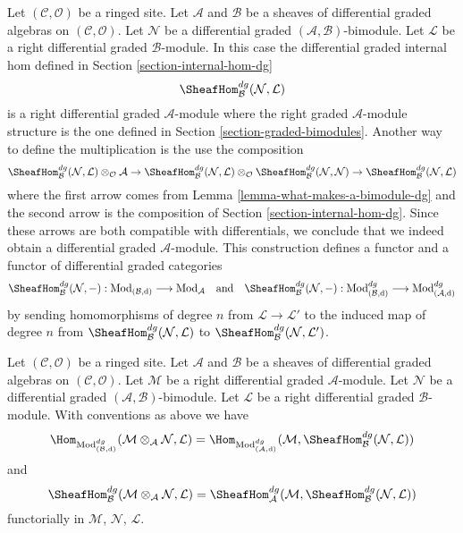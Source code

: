 \medskip\noindent
Let $(\mathcal{C}, \mathcal{O})$ be a ringed site. Let $\mathcal{A}$
and $\mathcal{B}$ be a sheaves of differential graded algebras on
$(\mathcal{C}, \mathcal{O})$. Let $\mathcal{N}$ be a
differential graded $(\mathcal{A}, \mathcal{B})$-bimodule. Let 
$\mathcal{L}$ be a right differential graded $\mathcal{B}$-module.
In this case the differential graded internal hom
defined in Section \ref{section-internal-hom-dg}
$$
\SheafHom_\mathcal{B}^{dg}(\mathcal{N}, \mathcal{L})
$$
is a right differential graded $\mathcal{A}$-module where the
right graded $\mathcal{A}$-module structure is the one defined
in Section \ref{section-graded-bimodules}. Another way to define
the multiplication is the use the composition
$$
\SheafHom_\mathcal{B}^{dg}(\mathcal{N}, \mathcal{L})
\otimes_\mathcal{O} \mathcal{A}
\to
\SheafHom_\mathcal{B}^{dg}(\mathcal{N}, \mathcal{L})
\otimes_\mathcal{O} \SheafHom_\mathcal{B}^{dg}(\mathcal{N}, \mathcal{N})
\to
\SheafHom_\mathcal{B}^{dg}(\mathcal{N}, \mathcal{L})
$$
where the first arrow comes from Lemma \ref{lemma-what-makes-a-bimodule-dg}
and the second arrow is the composition of
Section \ref{section-internal-hom-dg}. Since these arrows are
both compatible with differentials, we conclude that we indeed
obtain a differential graded $\mathcal{A}$-module.
This construction
defines a functor and a functor of differential graded categories
$$
\SheafHom_\mathcal{B}^{dg}(\mathcal{N}, -) :
\text{Mod}_{(\mathcal{B}, \text{d})}
\longrightarrow
\text{Mod}_\mathcal{A}
\quad\text{and}\quad
\SheafHom_\mathcal{B}^{dg}(\mathcal{N}, -) :
\text{Mod}^{dg}_{(\mathcal{B}, \text{d})}
\longrightarrow
\text{Mod}^{dg}_{(\mathcal{A}, \text{d})}
$$
by sending homomorphisms of degree $n$ from $\mathcal{L} \to \mathcal{L}'$
to the induced map of degree $n$ from
$\SheafHom_\mathcal{B}^{dg}(\mathcal{N}, \mathcal{L})$ to
$\SheafHom_\mathcal{B}^{dg}(\mathcal{N}, \mathcal{L}')$.

\begin{lemma}
\label{lemma-tensor-hom-adjunction-dg}
Let $(\mathcal{C}, \mathcal{O})$ be a ringed site. Let $\mathcal{A}$
and $\mathcal{B}$ be a sheaves of differential graded algebras on
$(\mathcal{C}, \mathcal{O})$. Let $\mathcal{M}$ be a right
differential graded $\mathcal{A}$-module. Let $\mathcal{N}$ be a
differential graded $(\mathcal{A}, \mathcal{B})$-bimodule. Let $\mathcal{L}$
be a right differential graded $\mathcal{B}$-module. With conventions as above
we have
$$
\Hom_{\text{Mod}_{(\mathcal{B}, \text{d})}^{dg}}(
\mathcal{M} \otimes_\mathcal{A} \mathcal{N}, \mathcal{L}) =
\Hom_{\text{Mod}_{(\mathcal{A}, \text{d})}^{dg}}(
\mathcal{M}, \SheafHom_\mathcal{B}^{dg}(\mathcal{N}, \mathcal{L}))
$$
and
$$
\SheafHom_\mathcal{B}^{dg}(
\mathcal{M} \otimes_\mathcal{A} \mathcal{N}, \mathcal{L}) =
\SheafHom_\mathcal{A}^{dg}(
\mathcal{M}, \SheafHom_\mathcal{B}^{dg}(\mathcal{N}, \mathcal{L}))
$$
functorially in $\mathcal{M}$, $\mathcal{N}$, $\mathcal{L}$.
\end{lemma}

